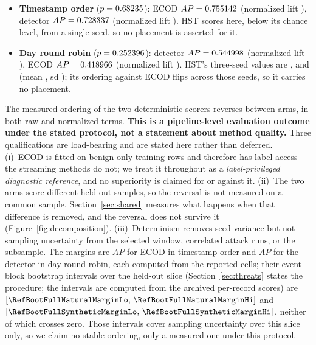 \documentclass[manuscript,screen,nonacm]{acmart}
\begin{document}
\begin{itemize}
\item \textbf{Timestamp order} ($p=0.68235$): ECOD
$AP=0.755142$ (normalized lift
\SFourCicidsNaturalEcodNormLift), detector
$AP=0.728337$ (normalized lift
\SFourCicidsNaturalProposedDetectorNormLift). HST scores
\SFourCicidsNaturalHstAucpr{} here, \SFourCicidsNaturalHstLiftAbs{} below its
chance level, from a single seed, so no placement is asserted for it.
\item \textbf{Day round robin} ($p=0.252396$): detector
$AP=0.544998$ (normalized lift
\SFourCicidsSyntheticProposedDetectorNormLift), ECOD
$AP=0.418966$ (normalized lift
\SFourCicidsSyntheticEcodNormLift). HST's three-seed values are
\SFourSeedCicidsTwoZeroOneSevenInterleavedSyntheticHstDrawOne,
\SFourSeedCicidsTwoZeroOneSevenInterleavedSyntheticHstDrawTwo{} and
\SFourSeedCicidsTwoZeroOneSevenInterleavedSyntheticHstDrawThree{} (mean
\SFourSeedCicidsTwoZeroOneSevenInterleavedSyntheticHstMean, sd
\SFourSeedCicidsTwoZeroOneSevenInterleavedSyntheticHstSd); its ordering against
ECOD flips across those seeds, so it carries no placement.
\end{itemize}

The measured ordering of the two deterministic scorers reverses between arms,
in both raw and normalized terms. \textbf{This is a pipeline-level evaluation
outcome under the stated protocol, not a statement about method quality.} Three
qualifications are load-bearing and are stated here rather than deferred.
(i)~ECOD is fitted on benign-only training rows and therefore has label access
the streaming methods do not; we treat it throughout as a \emph{label-privileged
diagnostic reference}, and no superiority is claimed for or against it.
(ii)~The two arms score different held-out samples, so the reversal is not
measured on a common sample. Section~\ref{sec:shared} measures what happens
when that difference is removed, and the reversal does not survive it
(Figure~\ref{fig:decomposition}).
(iii)~Determinism removes seed variance but not sampling uncertainty from the
selected window, correlated attack runs, or the subsample. The margins are
\SFourCicidsNaturalEcodMinusDetectorAucpr{} $AP$ for ECOD in timestamp order
and \SFourCicidsSyntheticDetectorMinusEcodAucpr{} $AP$ for the detector in day
round robin, each computed from the reported cells; their event-block bootstrap
intervals over the held-out slice (Section~\ref{sec:threats} states the
procedure; the intervals are computed from the archived per-record scores) are
$[\RefBootFullNaturalMarginLo,\,\RefBootFullNaturalMarginHi]$ and
$[\RefBootFullSyntheticMarginLo,\,\RefBootFullSyntheticMarginHi]$, neither of
which crosses zero. Those intervals cover sampling uncertainty over this slice
only, so we claim no stable ordering, only a measured one under this protocol.
\end{document}
